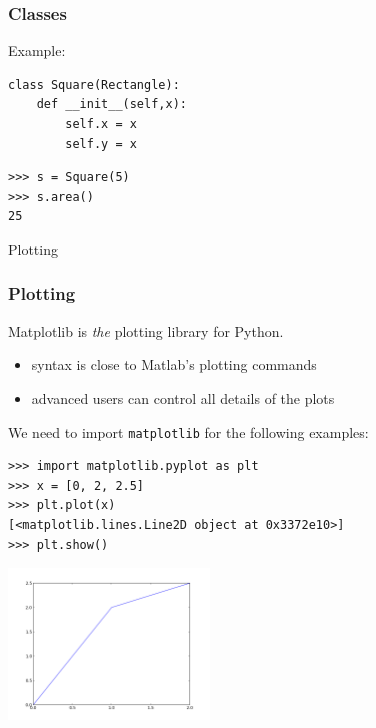 \begin{frame}[fragile]
\frametitle{Classes}
Example:
\begin{myColorBox}{0.9}{}
\begin{verbatim}
class Square(Rectangle):
    def __init__(self,x):
        self.x = x
        self.y = x
\end{verbatim}
\end{myColorBox}
\begin{myColorBox}{0.9}{}
\begin{verbatim}
>>> s = Square(5)
>>> s.area()
25
\end{verbatim}
\end{myColorBox}
\end{frame}

\begin{frame}
    \begin{center}
    \Huge{Plotting}
    \end{center}
\end{frame}

\begin{frame}[fragile]
    \frametitle{Plotting}
Matplotlib is \emph{the} plotting library for Python.
\begin{itemize}
\item syntax is close to Matlab's plotting commands
\item advanced users can control all details of the plots
\end{itemize}
We need to import \verb#matplotlib# for the following examples:
\begin{myColorBox}{0.9}{}
\begin{verbatim}
>>> import matplotlib.pyplot as plt
>>> x = [0, 2, 2.5]
>>> plt.plot(x)
[<matplotlib.lines.Line2D object at 0x3372e10>]
>>> plt.show()
\end{verbatim}
    \end{myColorBox}
\pause
\begin{center}
      \includegraphics[width=0.4\textwidth]{pix/matplotlib_example_1}
    \end{center}
\end{frame}

